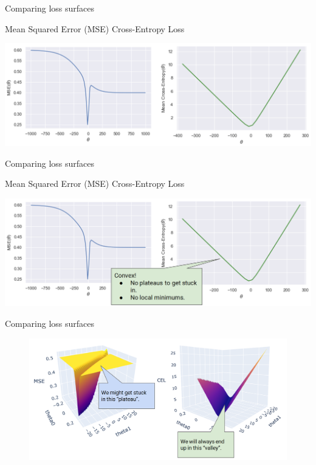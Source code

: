 \documentclass[aspectratio=169]{../latex_main/tntbeamer}  %
\begin{document}
	
	\begin{frame}{Comparing loss surfaces}
    
	        \centering
	        
	        Mean Squared Error (MSE) \hspace{2.5cm} Cross-Entropy Loss
	        
	        \includegraphics[scale=.35]{Bild21}
	\end{frame}
	
	
	\begin{frame}{Comparing loss surfaces}

	        \centering
	        
	        Mean Squared Error (MSE) \hspace{2.5cm} Cross-Entropy Loss
	        
	        \includegraphics[scale=.35]{Bild22}
	\end{frame}
	
	
	\begin{frame}{Comparing loss surfaces}
	    \begin{figure}
	        \centering
	        \includegraphics[scale=.35]{Bild23}
	    \end{figure}
	\end{frame}
	
\end{document}
